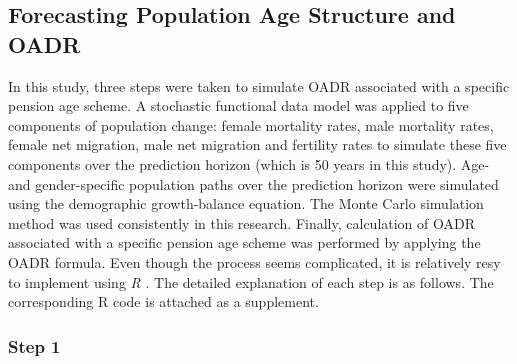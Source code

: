 \documentclass[11pt,a4paper,]{article}
\begin{document}
\hypertarget{sec:forecasting}{%
\subsection{Forecasting Population Age Structure and OADR}\label{sec:forecasting}}

In this study, three steps were taken to simulate OADR associated with a specific pension age scheme. A stochastic functional data model was applied to five components of population change: female mortality rates, male mortality rates, female net migration, male net migration and fertility rates to simulate these five components over the prediction horizon (which is 50 years in this study). Age- and gender-specific population paths over the prediction horizon were simulated using the demographic growth-balance equation. The Monte Carlo simulation method was used consistently in this research. Finally, calculation of OADR associated with a specific pension age scheme was performed by applying the OADR formula. Even though the process seems complicated, it is relatively resy to implement using \textit{R} \autocite{Team18}. The detailed explanation of each step is as follows. The corresponding R code is attached as a supplement.

\hypertarget{step-1}{%
\subsubsection*{Step 1}\label{step-1}}
\end{document}
